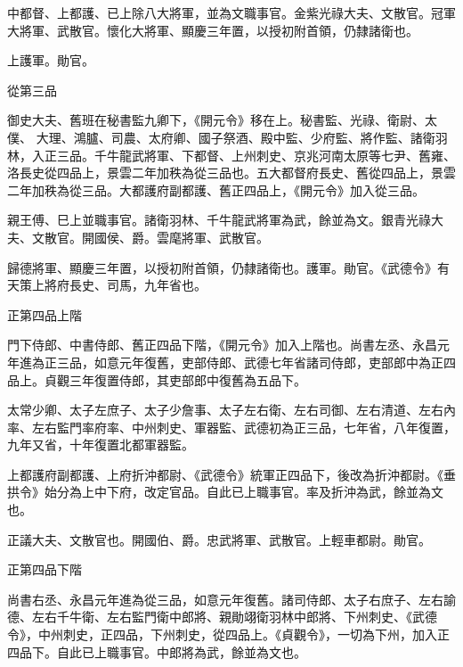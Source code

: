 \begin{pinyinscope}
 中都督、上都護、已上除八大將軍，並為文職事官。金紫光祿大夫、文散官。冠軍大將軍、武散官。懷化大將軍、顯慶三年置，以授初附首領，仍隸諸衛也。



 上護軍。勛官。



 從第三品



 御史大夫、舊班在秘書監九卿下，《開元令》移在上。秘書監、光祿、衛尉、太僕、
 大理、鴻臚、司農、太府卿、國子祭酒、殿中監、少府監、將作監、諸衛羽林，入正三品。千牛龍武將軍、下都督、上州刺史、京兆河南太原等七尹、舊雍、洛長史從四品上，景雲二年加秩為從三品也。五大都督府長史、舊從四品上，景雲二年加秩為從三品。大都護府副都護、舊正四品上，《開元令》加入從三品。



 親王傅、巳上並職事官。諸衛羽林、千牛龍武將軍為武，餘並為文。銀青光祿大夫、文散官。開國侯、爵。雲麾將軍、武散官。



 歸德將軍、顯慶三年置，以授初附首領，仍隸諸衛也。護軍。勛官。《武德令》有天策上將府長史、司馬，九年省也。



 正第四品上階



 門下侍郎、中書侍郎、舊正四品下階，《開元令》加入上階也。尚書左丞、永昌元年進為正三品，如意元年復舊，吏部侍郎、武德七年省諸司侍郎，吏部郎中為正四品上。貞觀三年復置侍郎，其吏部郎中復舊為五品下。



 太常少卿、太子左庶子、太子少詹事、太子左右衛、左右司御、左右清道、左右內率、左右監門率府率、中州刺史、軍器監、武德初為正三品，七年省，八年復置，九年又省，十年復置北都軍器監。



 上都護府副都護、上府折沖都尉、《武德令》統軍正四品下，後改為折沖都尉。《垂拱令》始分為上中下府，改定官品。自此已上職事官。率及折沖為武，餘並為文也。



 正議大夫、文散官也。開國伯、爵。忠武將軍、武散官。上輕車都尉。勛官。



 正第四品下階



 尚書右丞、永昌元年進為從三品，如意元年復舊。諸司侍郎、太子右庶子、左右諭德、左右千牛衛、左右監門衛中郎將、親勛翊衛羽林中郎將、下州刺史、《武德令》，中州刺史，正四品，下州刺史，從四品上。《貞觀令》，一切為下州，加入正四品下。自此已上職事官。中郎將為武，餘並為文也。




\end{pinyinscope}
